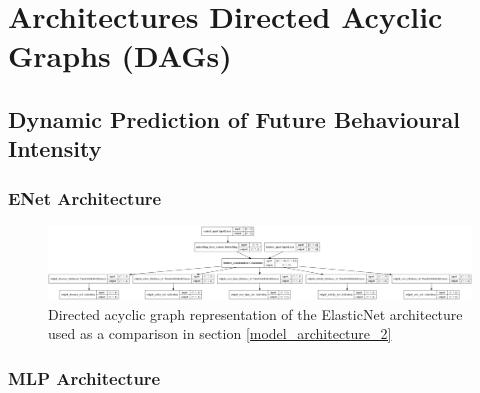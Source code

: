 \chapter{Architectures Directed Acyclic Graphs (DAGs)}

\section{Dynamic Prediction of Future Behavioural Intensity}

\subsection{ENet Architecture}
\begin{figure}[H]
\centering
\includegraphics[width=\textwidth,height=\textheight,keepaspectratio]{images/appendix_B/enet_2.png}
\caption[\textbf{ElasticNet DAG - Section \ref{model_architecture_2}}]{Directed acyclic graph representation of the ElasticNet architecture used as a comparison in section \ref{model_architecture_2}}
\label{enet_2_dag}
\end{figure}

\subsection{MLP Architecture}

